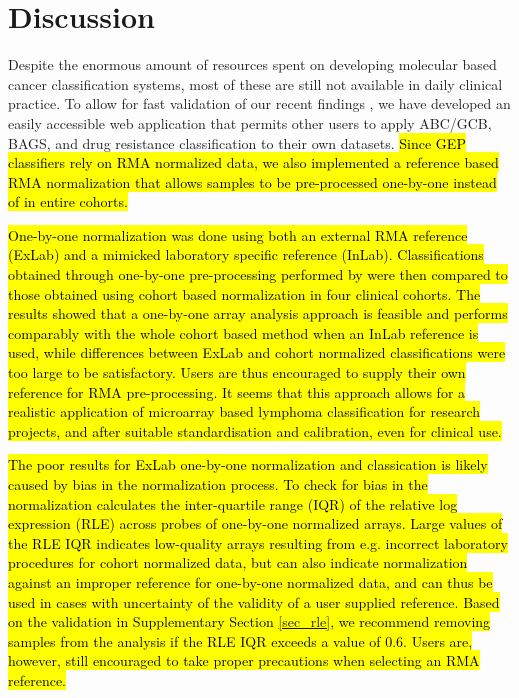 \documentclass{article}
\begin{document}
\section{Discussion}
Despite the enormous amount of resources spent on developing molecular based cancer classification systems,
most of these are still not available in daily clinical practice.
To allow for fast validation of our recent findings \citep{DybkaerBoegsted2015, Falgreen2015}, we have developed an easily accessible web application that permits other users to apply ABC/GCB, BAGS, and drug resistance classification to their own datasets. \hl{Since GEP classifiers rely on RMA normalized data, we also implemented a reference based RMA normalization that allows samples to be pre-processed one-by-one instead of in entire cohorts.}
	 
\hl{One-by-one normalization was done using both an external RMA reference (ExLab) and a mimicked laboratory specific reference (InLab). Classifications obtained through one-by-one pre-processing performed by \hemaClass{} were then compared to those obtained using cohort based normalization in four clinical cohorts. The results showed that a one-by-one array analysis approach is feasible and performs comparably with the whole cohort based method when an InLab reference is used, while differences between ExLab and cohort normalized classifications were too large to be satisfactory. Users are thus encouraged to supply their own reference for RMA pre-processing. It seems that this approach allows for a realistic application of microarray based lymphoma classification for research projects, and after suitable standardisation and calibration, even for clinical use.}

\hl{The poor results for ExLab one-by-one normalization and classication is likely caused by bias in the normalization process. To check for bias in the normalization \hemaClass{} calculates the inter-quartile range (IQR) of the relative log expression (RLE) \mbox{\citep{Bolstad2004b}} across probes of one-by-one normalized arrays. Large values of the RLE IQR indicates low-quality arrays resulting from e.g. incorrect laboratory procedures for cohort normalized data, but can also indicate normalization against an improper reference for one-by-one normalized data, and can thus be used in cases with uncertainty of the validity of a user supplied reference. Based on the validation in Supplementary Section \mbox{\ref{sec_rle}}, we recommend removing samples from the analysis if the RLE IQR exceeds a value of $0.6$. Users are, however, still encouraged to take proper precautions when selecting an RMA reference.}
\end{document}

